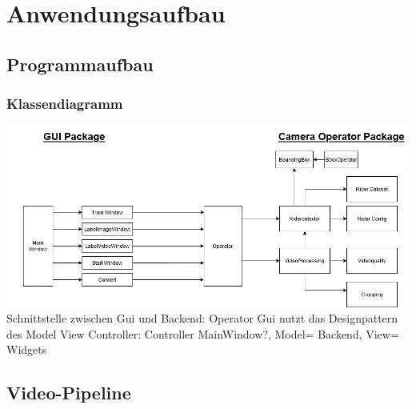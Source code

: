 \chapter{Anwendungsaufbau}
\label{ch:anwendungsaufbau}

\section{Programmaufbau}

\subsection*{Klassendiagramm}
\includegraphics[width=\textwidth]{./img/Klassendiagram.jpg}
Schnittstelle zwischen Gui und Backend: Operator
Gui nutzt das Designpattern des Model View Controller: Controller MainWindow?, Model= Backend, View= Widgets


\section{Video-Pipeline}

